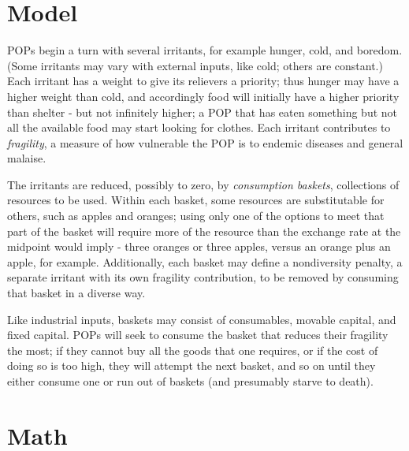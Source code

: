 \documentclass[12pt]{book}
\begin{document}
\section{Model}

POPs begin a turn with several irritants, for example hunger, cold,
and boredom. (Some irritants may vary with external inputs, like cold;
others are constant.) Each irritant has a weight to give its relievers
a priority; thus hunger may have a higher weight than cold, and
accordingly food will initially have a higher priority than shelter -
but not infinitely higher; a POP that has eaten something but not all
the available food may start looking for clothes. Each irritant
contributes to \emph{fragility}, a measure of how vulnerable the POP
is to endemic diseases and general malaise.

The irritants are reduced, possibly to zero, by \emph{consumption
  baskets}, collections of resources to be used. Within each basket,
some resources are substitutable for others, such as apples and
oranges; using only one of the options to meet that part of the basket
will require more of the resource than the exchange rate at the
midpoint would imply - three oranges or three apples, versus an orange
plus an apple, for example. Additionally, each basket may define a
nondiversity penalty, a separate irritant with its own fragility
contribution, to be removed by consuming that basket in a diverse
way. 

Like industrial inputs, baskets may consist of consumables, movable
capital, and fixed capital. POPs will seek to consume the basket that
reduces their fragility the most; if they cannot buy all the goods
that one requires, or if the cost of doing so is too high, they will
attempt the next basket, and so on until they either consume one or
run out of baskets (and presumably starve to death). 

\section{Math}
\end{document}

